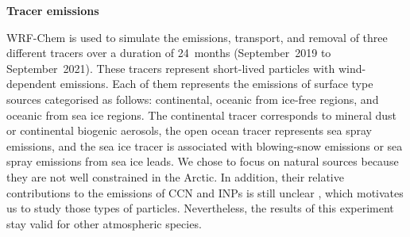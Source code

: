 
    \vspace{\baselineskip}
    \textbf{Tracer emissions}

            WRF-Chem is used to simulate the emissions, transport, and removal of three different tracers over a duration of 24~months (September~2019 to September~2021).
            These tracers represent short-lived particles with wind-dependent emissions. Each of them represents the emissions of surface type sources categorised as follows: continental, oceanic from ice-free regions, and oceanic from sea ice regions.
            The continental tracer corresponds to mineral dust or continental biogenic aerosols, the open ocean tracer represents sea spray emissions, and the sea ice tracer is associated with blowing-snow emissions or sea spray emissions from sea ice leads.
            We chose to focus on natural sources because they are not well constrained in the Arctic. In addition, their relative contributions to the emissions of CCN and INPs is still unclear \citep{burrows_ice_2013, gong_arctic_2023, hartmann_terrestrial_2021}, which motivates us to study those types of particles.
            Nevertheless, the results of this experiment stay valid for other atmospheric species.

